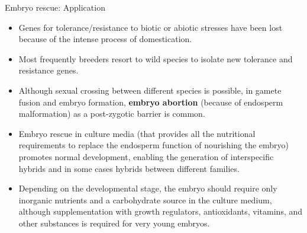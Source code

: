 \documentclass[
  ignorenonframetext,
  aspectratio=169]{beamer}
\providecommand{\tightlist}{%
  \setlength{\itemsep}{0pt}\setlength{\parskip}{0pt}}
\begin{document}
\begin{frame}{Embryo rescue: Application}
\protect\hypertarget{embryo-rescue-application}{}
\footnotesize

\begin{itemize}
\tightlist
\item
  Genes for tolerance/resistance to biotic or abiotic stresses have been
  lost because of the intense process of domestication.
\item
  Most frequently breeders resort to wild species to isolate new
  tolerance and resistance genes.
\item
  Although sexual crossing between different species is possible, in
  gamete fusion and embryo formation, \textbf{embryo abortion} (because
  of endosperm malformation) as a post-zygotic barrier is common.
\item
  Embryo rescue in culture media (that provides all the nutritional
  requirements to replace the endosperm function of nourishing the
  embryo) promotes normal development, enabling the generation of
  interspecific hybrids and in some cases hybrids between different
  families.
\item
  Depending on the developmental stage, the embryo should require only
  inorganic nutrients and a carbohydrate source in the culture medium,
  although supplementation with growth regulators, antioxidants,
  vitamins, and other substances is required for very young embryos.
\end{itemize}
\end{frame}
\end{document}
